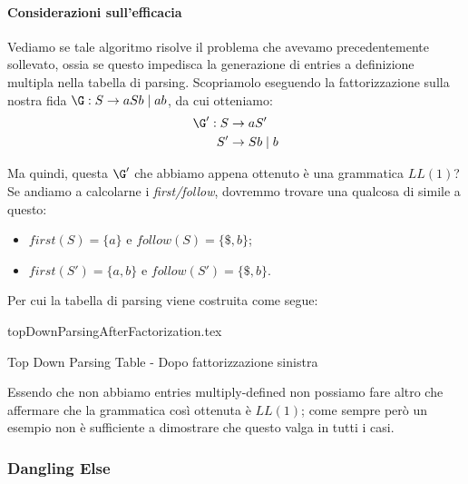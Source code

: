 \documentclass[class=book, crop=false, oneside, 12pt]{standalone}
\begin{document}
\paragraph{Considerazioni sull'efficacia}
Vediamo se tale algoritmo risolve il problema che avevamo precedentemente sollevato, ossia se questo impedisca la generazione di entries a definizione multipla nella tabella di parsing. Scopriamolo eseguendo la fattorizzazione sulla nostra fida \(\G: S \to aSb \mid ab\), da cui otteniamo:
\begin{align*}
    \G': S &\rightarrow aS' \\
    S' &\rightarrow Sb \mid b
\end{align*}

Ma quindi, questa \(\G'\) che abbiamo appena ottenuto è una grammatica \(LL(1)\)? Se andiamo a calcolarne i \emph{first/follow}, dovremmo trovare una qualcosa di simile a questo:
\begin{itemize}
    \item \(first(S) = \{a\}\) e \(follow(S) = \{\$, b\}\);
    \item \(first(S') = \{a, b\}\) e \(follow(S') = \{\$, b\}\).
\end{itemize}
Per cui la tabella di parsing viene costruita come segue:
\begin{table}[H]
    \centering
    {topDownParsingAfterFactorization.tex}
    \caption{Top Down Parsing Table - Dopo fattorizzazione sinistra}
    \label{topDownParsingAfterFactorization}
\end{table}

Essendo che non abbiamo entries multiply-defined non possiamo fare altro che affermare che la grammatica così ottenuta è \(LL(1)\); come sempre però un esempio non è sufficiente a dimostrare che questo valga in tutti i casi.

\subsubsection{Dangling Else}
\end{document}
